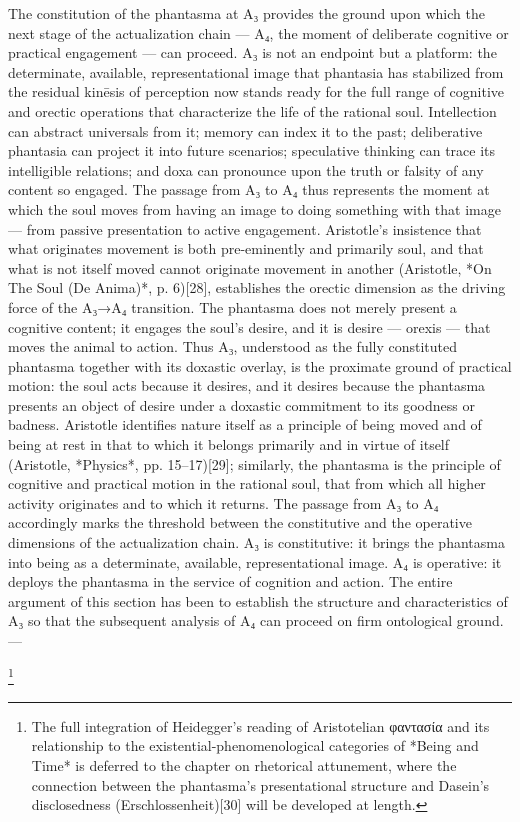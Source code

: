 The constitution of the phantasma at A₃ provides the ground upon which the next stage of the actualization chain — A₄, the moment of deliberate cognitive or practical engagement — can proceed. A₃ is not an endpoint but a platform: the determinate, available, representational image that phantasia has stabilized from the residual kinēsis of perception now stands ready for the full range of cognitive and orectic operations that characterize the life of the rational soul. Intellection can abstract universals from it; memory can index it to the past; deliberative phantasia can project it into future scenarios; speculative thinking can trace its intelligible relations; and doxa can pronounce upon the truth or falsity of any content so engaged. The passage from A₃ to A₄ thus represents the moment at which the soul moves from having an image to doing something with that image — from passive presentation to active engagement. Aristotle's insistence that what originates movement is both pre-eminently and primarily soul, and that what is not itself moved cannot originate movement in another (Aristotle, *On The Soul (De Anima)*, p. 6)[28], establishes the orectic dimension as the driving force of the A₃→A₄ transition. The phantasma does not merely present a cognitive content; it engages the soul's desire, and it is desire — orexis — that moves the animal to action. Thus A₃, understood as the fully constituted phantasma together with its doxastic overlay, is the proximate ground of practical motion: the soul acts because it desires, and it desires because the phantasma presents an object of desire under a doxastic commitment to its goodness or badness. Aristotle identifies nature itself as a principle of being moved and of being at rest in that to which it belongs primarily and in virtue of itself (Aristotle, *Physics*, pp. 15–17)[29]; similarly, the phantasma is the principle of cognitive and practical motion in the rational soul, that from which all higher activity originates and to which it returns. The passage from A₃ to A₄ accordingly marks the threshold between the constitutive and the operative dimensions of the actualization chain. A₃ is constitutive: it brings the phantasma into being as a determinate, available, representational image. A₄ is operative: it deploys the phantasma in the service of cognition and action. The entire argument of this section has been to establish the structure and characteristics of A₃ so that the subsequent analysis of A₄ can proceed on firm ontological ground. ---

\footnote{The full integration of Heidegger's reading of Aristotelian φαντασία and its relationship to the existential-phenomenological categories of *Being and Time* is deferred to the chapter on rhetorical attunement, where the connection between the phantasma's presentational structure and Dasein's disclosedness (Erschlossenheit)[30] will be developed at length.}

